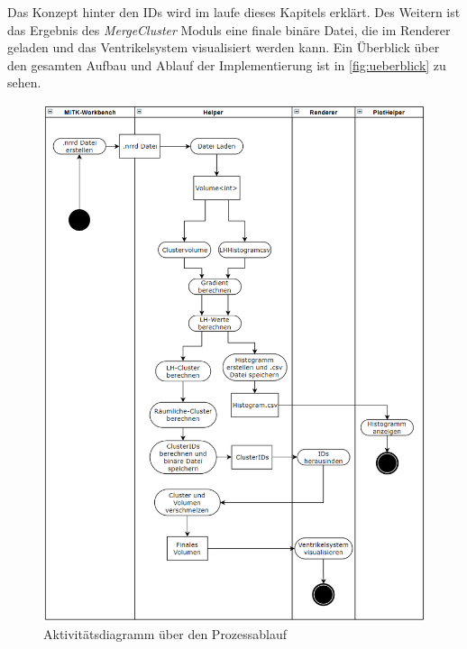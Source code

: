 Das Konzept hinter den IDs wird im laufe dieses Kapitels erklärt. Des Weitern ist das Ergebnis des \textit{MergeCluster} Moduls eine finale binäre Datei, die im Renderer geladen und das Ventrikelsystem visualisiert werden kann. Ein Überblick über den gesamten Aufbau und Ablauf der Implementierung ist in  \autoref{fig:ueberblick} zu sehen.


\begin{figure}
\centering 
\includegraphics[width=\textwidth]{Logos/Ueberblick2.png}
\caption{Aktivitätsdiagramm über den Prozessablauf} 
\label{fig:ueberblick} 
\end{figure}


